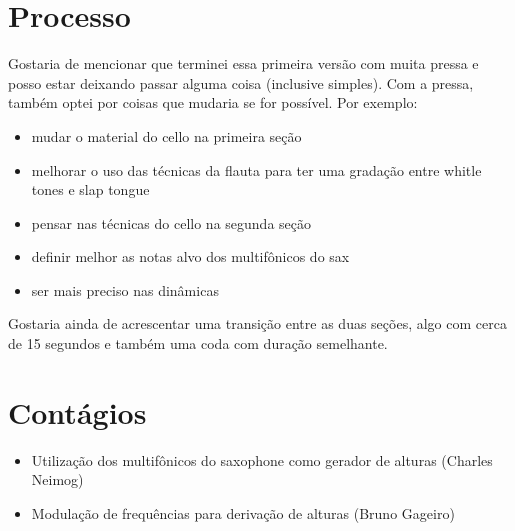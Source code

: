 \documentclass[article,12pt,openany,oneside,a4paper,chapter=TITLE,hyphen,english,brazil,chapter=TITLE,sumario=tradicional]{abntex2}
\begin{document}
\section*{Processo}
\label{sec:orge3aad50}
Gostaria de mencionar que terminei essa primeira versão com muita pressa e posso estar deixando passar alguma coisa (inclusive simples). Com a pressa, também optei por coisas que mudaria se for possível. Por exemplo:
\begin{itemize}
\item mudar o material do cello na primeira seção
\item melhorar o uso das técnicas da flauta para ter uma gradação entre whitle tones e slap tongue
\item pensar nas técnicas do cello na segunda seção
\item definir melhor as notas alvo dos multifônicos do sax
\item ser mais preciso nas dinâmicas
\end{itemize}

Gostaria ainda de acrescentar uma transição entre as duas seções, algo com cerca de 15 segundos e também uma coda com duração semelhante.

\section*{Contágios}
\label{sec:org85df8b4}
\begin{itemize}
\item Utilização dos multifônicos do saxophone como gerador de alturas (Charles Neimog)
\item Modulação de frequências para derivação de alturas (Bruno Gageiro)
\end{itemize}


\end{document}
